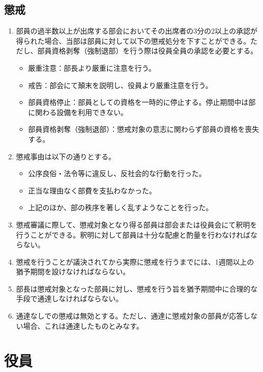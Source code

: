 \documentclass[12pt, unicode, a4paper]{ltjsreport}
\begin{document}
    \section{懲戒}\label{disciplinary}
        \begin{enumerate}
            \item 部員の過半数以上が出席する部会においてその出席者の3分の2以上の承認が得られた場合、当部は部員に対して以下の懲戒処分を下すことができる。ただし、部員資格剥奪（強制退部）を行う際は役員全員の承認を必要とする。
            \begin{itemize}
                \item 厳重注意：部長より厳重に注意を行う。
                \item 戒告：部会にて顛末を説明し、役員より厳重注意を行う。
                \item 部員資格停止：部員としての資格を一時的に停止する。停止期間中は部に関わる設備を利用できない。
                \item 部員資格剥奪（強制退部）：懲戒対象の意志に関わらず部員の資格を喪失する。
            \end{itemize}
            \item 懲戒事由は以下の通りとする。
            \begin{itemize}
                \item 公序良俗・法令等に違反し、反社会的な行動を行った。
                \item 正当な理由なく部費を支払わなかった。
                \item 上記のほか、部の秩序を著しく乱すようなことを行った。
            \end{itemize}
            \item 懲戒審議に際して、懲戒対象となり得る部員は部会または役員会にて釈明を行うことができる。釈明に対して部員は十分な配慮と酌量を行わなければならない。
            \item 懲戒を行うことが議決されてから実際に懲戒を行うまでには、1週間以上の猶予期間を設けなければならない。
            \item 部長は懲戒対象となった部員に対し、懲戒を行う旨を猶予期間中に合理的な手段で通達しなければならない。
            \item 通達なしでの懲戒は無効とする。ただし、通達に懲戒対象の部員が応答しない場合、これは通達したものとみなす。
        \end{enumerate}


\chapter{役員}
\end{document}
